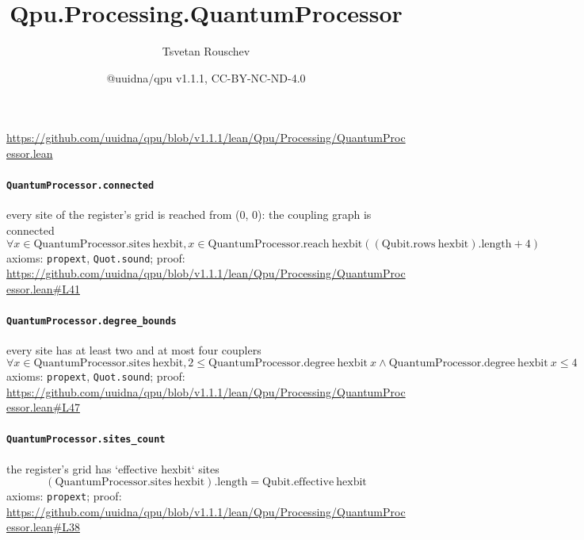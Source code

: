 \documentclass[11pt]{article}
\title{Qpu.Processing.QuantumProcessor}
\author{Tsvetan Rouschev}
\date{@uuidna/qpu v1.1.1, CC-BY-NC-ND-4.0}
\begin{document}
\maketitle
\noindent\url{https://github.com/uuidna/qpu/blob/v1.1.1/lean/Qpu/Processing/QuantumProcessor.lean}

\paragraph{\texttt{QuantumProcessor.connected}}
every site of the register's grid is reached from (0, 0): the coupling graph is connected
\[ \forall x \in \mathrm{QuantumProcessor.sites}\ \mathrm{hexbit}, x \in \mathrm{QuantumProcessor.reach}\ \mathrm{hexbit} ((\mathrm{Qubit.rows}\ \mathrm{hexbit})\mathrm{.length} + 4) \]
\noindent axioms: \texttt{propext}, \texttt{Quot.sound}; proof: \url{https://github.com/uuidna/qpu/blob/v1.1.1/lean/Qpu/Processing/QuantumProcessor.lean\#L41}

\paragraph{\texttt{QuantumProcessor.degree\_bounds}}
every site has at least two and at most four couplers
\[ \forall x \in \mathrm{QuantumProcessor.sites}\ \mathrm{hexbit}, 2 \le \mathrm{QuantumProcessor.degree}\ \mathrm{hexbit}\ x \land \mathrm{QuantumProcessor.degree}\ \mathrm{hexbit}\ x \le 4 \]
\noindent axioms: \texttt{propext}, \texttt{Quot.sound}; proof: \url{https://github.com/uuidna/qpu/blob/v1.1.1/lean/Qpu/Processing/QuantumProcessor.lean\#L47}

\paragraph{\texttt{QuantumProcessor.sites\_count}}
the register's grid has `effective hexbit` sites
\[ (\mathrm{QuantumProcessor.sites}\ \mathrm{hexbit})\mathrm{.length} = \mathrm{Qubit.effective}\ \mathrm{hexbit} \]
\noindent axioms: \texttt{propext}; proof: \url{https://github.com/uuidna/qpu/blob/v1.1.1/lean/Qpu/Processing/QuantumProcessor.lean\#L38}
\end{document}
